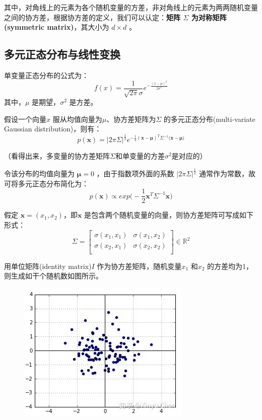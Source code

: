 \documentclass[12pt]{article}
\begin{document}
其中，对角线上的元素为各个随机变量的方差，非对角线上的元素为两两随机变量之间的协方差，根据协方差的定义，我们可以认定：\textbf{矩阵 $\Sigma$ 为对称矩阵(symmetric matrix)}，其大小为 $d \times d$ 。

\subsection{多元正态分布与线性变换}
\begin{mdframed}[
linecolor=black!40,outerlinewidth=1pt,roundcorner=.5em,innertopmargin=1ex,innerbottommargin=.5\baselineskip,innerrightmargin=1em,innerleftmargin=1em,backgroundcolor=gray!5,
]
单变量正态分布的公式为：
$$
f(x) = \frac{1}{\sqrt{2 \pi}\sigma}e^{-\frac{(x - \mu)^2}{2\sigma^2}}
$$
其中，$\mu$ 是期望，$\sigma^2$ 是方差。

假设一个向量$x$ 服从均值向量为$\mu$、协方差矩阵为$\Sigma$ 的多元正态分布(multi-variate Gaussian distribution)，则有：
$$
p(\mathbf{x}) = |2\pi\Sigma|^{\frac{1}{2}}e^{-\frac{1}{2}(\mathbf{x}-\mathbf{\mu})^T\Sigma^{-1}(\mathbf{x}-\mathbf{\mu)}}
$$

（看得出来，多变量的协方差矩阵$\Sigma$和单变量的方差$\sigma^2$是对应的）
\end{mdframed}

令该分布的均值向量为 $\mathbf{\mu}=0$ ，由于指数项外面的系数 $|2\pi\Sigma|^{\frac{1}{2}}$ 通常作为常数，故可将多元正态分布简化为：
$$
p(\mathbf{x}) \propto exp\big(-\frac{1}{2}\mathbf{x}^T\Sigma^{-1}\mathbf{x}\big)
$$

假定 $\mathbf{x} = (x_1, x_2)$，即$\mathbf{x}$ 是包含两个随机变量的向量，则协方差矩阵可写成如下形式：
$$
\Sigma = \begin{bmatrix}
\sigma(x_1, x_1) & \sigma(x_1, x_2) \\
\sigma(x_2, x_1) & \sigma(x_2, x_2) \\
\end{bmatrix}
\in \mathbb{R}^2
$$

用单位矩阵(identity matrix)$I$ 作为协方差矩阵，随机变量$x_1$ 和$x_2$ 的方差均为1，则生成如干个随机数如图所示。
\begin{figure}[H]
\centering
\includegraphics[width=.3\textwidth]{fig/UnderstandCovarianceMatrix_2.jpg} 
\end{figure}
\end{document}
